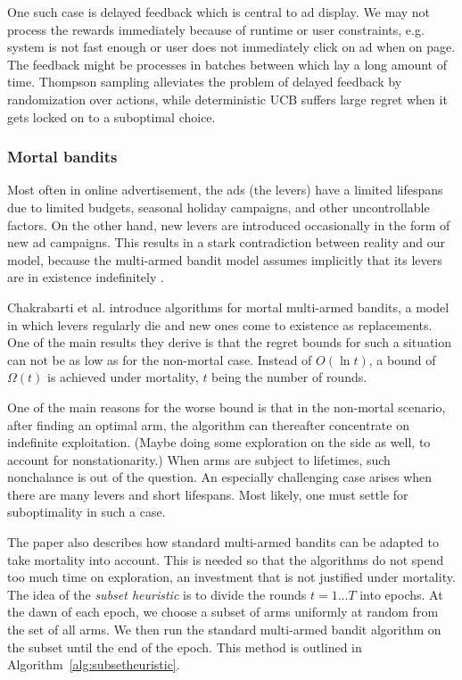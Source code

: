 \documentclass{article} %
\begin{document}
One such case is delayed feedback which is central to ad display. We may
not process the rewards immediately because of runtime or user constraints,
e.g. system is not fast enough or user does not immediately click on ad when on
page. The feedback might be processes in batches between which lay a long
amount of time. Thompson sampling alleviates the problem of delayed feedback by
randomization over actions, while deterministic UCB suffers large regret when
it gets locked on to a suboptimal choice.

\subsubsection{Mortal bandits}
Most often in online advertisement, the ads (the levers) have a limited
lifespans due to limited budgets, seasonal holiday campaigns, and other
uncontrollable factors. On the other hand, new levers are introduced
occasionally in the form of new ad campaigns. This results in a stark
contradiction between reality and our model, because the multi-armed bandit
model assumes implicitly that its levers are in existence indefinitely
\cite{chakrabarti2008mortal}.

Chakrabarti et al. \cite{chakrabarti2008mortal} introduce algorithms for mortal
multi-armed bandits, a model in which levers regularly die and new ones come to
existence as replacements. One of the main results they derive is that the
regret bounds for such a situation can not be as low as for the non-mortal
case. Instead of $O(\ln t)$, a bound of $\Omega(t)$ is achieved under
mortality, $t$ being the number of rounds.

One of the main reasons for the worse bound is that in the non-mortal scenario,
after finding an optimal arm, the algorithm can thereafter concentrate on
indefinite exploitation. (Maybe doing some exploration on the side as well, to
account for nonstationarity.) When arms are subject to lifetimes, such
nonchalance is out of the question.  An especially challenging case arises when
there are many levers and short lifespans. Most likely, one must settle for
suboptimality in such a case.

The paper \cite{chakrabarti2008mortal} also describes how standard multi-armed
bandits can be adapted to take mortality into account. This is needed so that
the algorithms do not spend too much time on exploration, an investment that is
not justified under mortality. The idea of the \emph{subset heuristic} is to
divide the rounds $t=1...T$ into epochs. At the dawn of each epoch, we choose a
subset of arms uniformly at random from the set of all arms. We then run the
standard multi-armed bandit algorithm on the subset until the end of the epoch.
This method is outlined in Algorithm~\ref{alg:subsetheuristic}.
\end{document}
